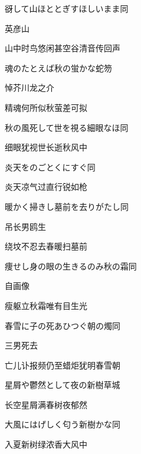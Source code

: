 \begin{haiku}
    {\FH 谺して山ほととぎすほしいまま}\hfill{\FH 同}

    {\FK 英彦山}

    {\FK 山中时鸟悠闲甚空谷清音传回声}
\end{haiku}

\begin{haiku}
    {\FH 魂のたとえば秋の蛍かな}\hfill{\FH 蛇笏}

    {\FK 悼芥川龙之介}

    {\FK 精魂何所似秋萤差可拟}
\end{haiku}

\begin{haiku}
    {\FH 秋の風死して世を視る細眼なほ}\hfill{\FH 同}

    {\FK 细眼犹视世长逝秋风中}
\end{haiku}

\begin{haiku}
    {\FH 炎天をのごとくにすぐ}\hfill{\FH 同}

    {\FK 炎天凉气过直行锐如枪}
\end{haiku}

\begin{haiku}
    {\FH 暖かく掃きし墓前を去りがたし}\hfill{\FH 同}

    {\FK 吊长男鸥生}

    {\FK 绕坟不忍去春暖扫墓前}
\end{haiku}

\begin{haiku}
    {\FH 痩せし身の眼の生きるのみ秋の霜}\hfill{\FH 同}

    {\FK 自画像}

    {\FK 瘦躯立秋霜唯有目生光}
\end{haiku}

\begin{haiku}
    {\FH 春雪に子の死あひつぐ朝の燭}\hfill{\FH 同}

    {\FK 三男死去}

    {\FK 亡儿讣报频仍至蜡炬犹明春雪朝}
\end{haiku}

\begin{haiku}
    {\FH 星屑や鬱然として夜の新樹}\hfill{\FH 草城}

    {\FK 长空星屑满春树夜郁然}
\end{haiku}

\begin{haiku}
    {\FH 大風にはげしく匂う新樹かな}\hfill{\FH 同}

    {\FK 入夏新树绿浓香大风中}
\end{haiku}

